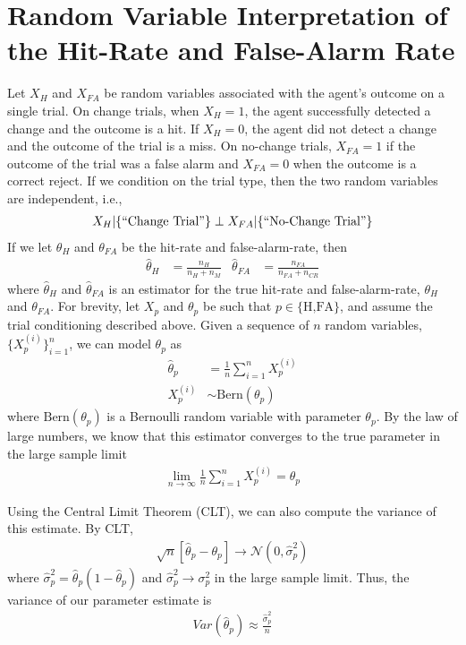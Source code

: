 \documentclass[12pt]{article}
\begin{document}
\section{Random Variable Interpretation of the Hit-Rate and False-Alarm Rate}
Let $X_H$ and $X_{FA}$ be random variables associated with the agent's outcome on a single trial. On change trials, when $X_H=1$, the agent successfully detected a change and the outcome is a hit. If $X_H=0$, the agent did not detect a change and the outcome of the trial is a miss. On no-change trials, $X_{FA}=1$ if the outcome of the trial was a false alarm and $X_{FA}=0$ when the outcome is a correct reject. If we condition on the trial type, then the two random variables are independent, i.e.,
\begin{align*}
    X_{H}|\{\text{\textquotedblleft Change Trial\textquotedblright}\} \perp X_{FA}|\{\text{\textquotedblleft No-Change Trial\textquotedblright}\}
\end{align*}
If we let $\theta_{H}$ and $\theta_{FA}$ be the hit-rate and false-alarm-rate, then 
\begin{equation}
\begin{aligned}
\hat{\theta}_{H} &= \frac{n_H}{n_H + n_M} & \hat{\theta}_{FA} &= \frac{n_{FA}}{n_{FA} + n_{CR}}
\end{aligned}
\end{equation}
where $\hat{\theta}_H$ and $\hat{\theta}_{FA}$ is an estimator for the true hit-rate and false-alarm-rate, $\theta_H$ and $\theta_{FA}$.
For brevity, let $X_p$ and $\theta_p$ be such that $p \in \{\text{H,FA}\}$, and assume the trial conditioning described above. Given a sequence of $n$ random variables, $\{X_p^{(i)}\}_{i=1}^{n}$, we can model $\theta_p$ as 
\begin{align*}
    \hat{\theta}_p &= \frac{1}{n}\sum_{i=1}^{n}X_p^{(i)} \\
    X_p^{(i)} &\sim \text{Bern}(\theta_p)
\end{align*}
where $\text{Bern}(\theta_p)$ is a Bernoulli random variable with parameter $\theta_p$. By the law of large numbers, we know that this estimator converges to the true parameter in the large sample limit
\begin{align*}
    \lim_{n \rightarrow \infty} \frac{1}{n}\sum_{i=1}^{n}X_p^{(i)} = \theta_p
\end{align*}

Using the Central Limit Theorem (CLT), we can also compute the variance of this estimate. By CLT, 
\begin{align*}
    \sqrt{n}\left[ \hat{\theta}_p - \theta_p \right] \rightarrow \mathcal{N}(0,\hat{\sigma}_p^2)
\end{align*}
where $\hat{\sigma}_p^{2} = \hat{\theta}_p(1-\hat{\theta}_p)$ and $\hat{\sigma}^2_p\rightarrow \sigma^2_p$ in the large sample limit. Thus, the variance of our parameter estimate is 
\begin{align*}
    Var(\hat{\theta}_p) \approx  \frac{\hat{\sigma}_p^2}{n}
\end{align*}
\end{document}

